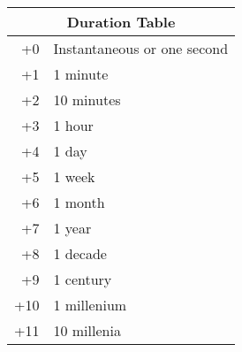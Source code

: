\begin{tabularx}{\marginparwidth}{rX}
\multicolumn{2}{c}{Duration Table} \\
\hline
+0 & Instantaneous or one second \\
+1 & 1 minute \\
+2 & 10 minutes \\
+3 & 1 hour \\
+4 & 1 day \\
+5 & 1 week \\
+6 & 1 month \\
+7 & 1 year \\
+8 & 1 decade \\
+9 & 1 century \\
+10 & 1 millenium \\
+11 & 10 millenia \\
\end{tabularx}